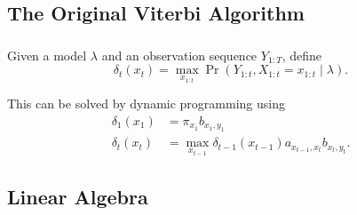 \documentclass[english,notes]{beamer}
\begin{document}
\subsection{The Original Viterbi Algorithm}
\begin{frame}
  \frametitle{\insertsubsection}
  \onslide<+->
  Given a model $\lambda$ and an observation sequence $Y_{1:T}$, define
  \begin{equation*}
    \delta_t(x_t) = \max_{x_{1:t}} \Pr(Y_{1:t}, X_{1:t} = x_{1:t} \mid \lambda).
  \end{equation*}

  \onslide<+->
  This can be solved by dynamic programming using
  \begin{equation*}
    \begin{aligned}
      \delta_1(x_1) &= \pi_{x_1} b_{x_1, y_1} \\
      \delta_t(x_t) &= \max_{x_{t - 1}} \delta_{t - 1}(x_{t - 1}) a_{x_{t - 1}, x_t} b_{x_t, y_t} .
    \end{aligned}
  \end{equation*}

  \onslide<+->
  \begin{center}
    
  \end{center}


\end{frame}

\subsection{Linear Algebra}
\end{document}
